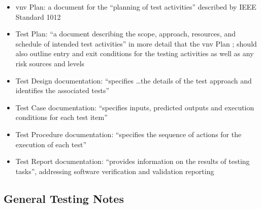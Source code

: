 \begin{itemize}
      \item \acf{vnv} Plan: a document for the ``planning of test activities''
            described by IEEE Standard 1012 \cite[p.~411]{van_vliet_software_2000}
      \item Test Plan: ``a document describing the scope, approach, resources,
            and schedule of intended test activities'' in more detail that the
            \acs{vnv} Plan \cite[p.~412-413]{van_vliet_software_2000};
            should also outline entry and exit conditions for the testing
            activities as well as any risk sources and levels
            \cite[p.~445]{peters_software_2000}
      \item Test Design documentation: ``specifies \dots the details of the
            test approach and identifies the associated tests''
            \cite[p.~413]{van_vliet_software_2000}
      \item Test Case documentation: ``specifies inputs, predicted outputs and
            execution conditions for each test item''
            \cite[p.~413]{van_vliet_software_2000}
      \item Test Procedure documentation: ``specifies the sequence of actions
            for the execution of each test'' \cite[p.~413]{van_vliet_software_2000}
      \item Test Report documentation: ``provides information on the results of
            testing tasks'', addressing software verification and validation
            reporting \cite[p.~413]{van_vliet_software_2000}
\end{itemize}

\subsection{General Testing Notes}

